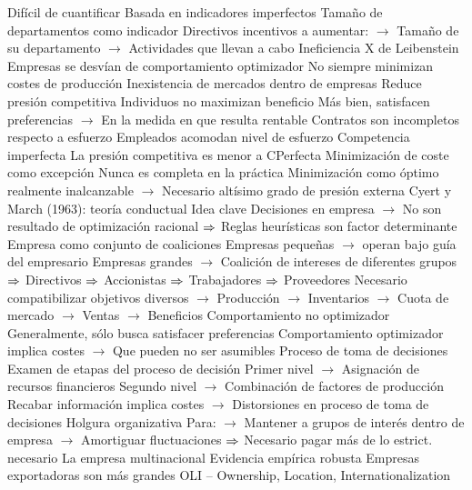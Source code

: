 \documentclass{nuevotema}
\begin{document}
\begin{esquemal}
				\4[] Difícil de cuantificar
				\4[] Basada en indicadores imperfectos
				\4 Tamaño de departamentos como indicador
				\4[] Directivos incentivos a aumentar:
				\4[] $\to$ Tamaño de su departamento
				\4[] $\to$ Actividades que llevan a cabo
			\3 Ineficiencia X de Leibenstein
				\4 Empresas se desvían de comportamiento optimizador
				\4[] No siempre minimizan costes de producción
				\4 Inexistencia de mercados dentro de empresas
				\4[] Reduce presión competitiva
				\4 Individuos no maximizan beneficio
				\4[] Más bien, satisfacen preferencias
				\4[] $\to$ En la medida en que resulta rentable
				\4 Contratos son incompletos respecto a esfuerzo
				\4[] Empleados acomodan nivel de esfuerzo
				\4 Competencia imperfecta
				\4[] La presión competitiva es menor a CPerfecta
				\4 Minimización de coste como excepción
				\4[] Nunca es completa en la práctica
				\4[] Minimización como óptimo realmente inalcanzable
				\4[] $\to$ Necesario altísimo grado de presión externa
			\3 Cyert y March (1963): teoría conductual
				\4 Idea clave
				\4[] Decisiones en empresa
				\4[] $\to$ No son resultado de optimización racional
				\4[] $\Rightarrow$ Reglas heurísticas son factor determinante
				\4 Empresa como conjunto de coaliciones
				\4[] Empresas pequeñas
				\4[] $\to$ operan bajo guía del empresario
				\4[] Empresas grandes
				\4[] $\to$ Coalición de intereses de diferentes grupos
				\4[] $\Rightarrow$ Directivos
				\4[] $\Rightarrow$ Accionistas
				\4[] $\Rightarrow$ Trabajadores
				\4[] $\Rightarrow$ Proveedores
				\4[] Necesario compatibilizar objetivos diversos
				\4[] $\to$ Producción
				\4[] $\to$ Inventarios
				\4[] $\to$ Cuota de mercado
				\4[] $\to$ Ventas
				\4[] $\to$ Beneficios
				\4 Comportamiento no optimizador
				\4[] Generalmente, sólo busca satisfacer preferencias
				\4[] Comportamiento optimizador implica costes
				\4[] $\to$ Que pueden no ser asumibles
				\4 Proceso de toma de decisiones
				\4[] Examen de etapas del proceso de decisión
				\4[] Primer nivel
				\4[] $\to$ Asignación de recursos financieros
				\4[] Segundo nivel
				\4[] $\to$ Combinación de factores de producción
				\4[] Recabar información implica costes
				\4[] $\to$ Distorsiones en proceso de toma de decisiones
				\4 Holgura organizativa
				\4[] Para:
				\4[] $\to$ Mantener a grupos de interés dentro de empresa
				\4[] $\to$ Amortiguar fluctuaciones
				\4[] $\Rightarrow$ Necesario pagar más de lo estrict. necesario
			\3 La empresa multinacional
				\4 Evidencia empírica robusta
				\4[] Empresas exportadoras son más grandes
				\4 OLI -- Ownership, Location, Internationalization

\end{esquemal}
\end{document}
